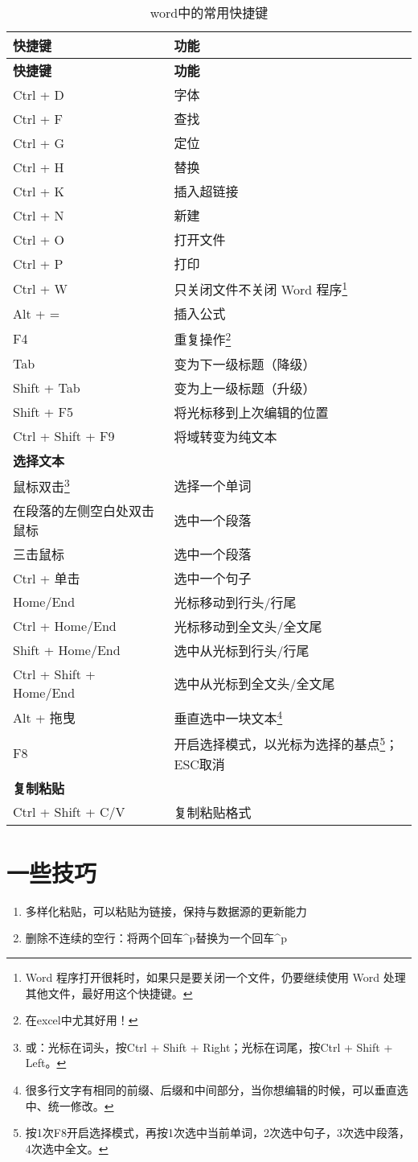 \documentclass[]{ctexbook}
\providecommand{\tightlist}{%
  \setlength{\itemsep}{0pt}\setlength{\parskip}{0pt}}
\begin{document}
\begin{longtable}[]{@{}ll@{}}
\caption{\label{tab:word-short} word中的常用快捷键}\tabularnewline
\toprule
\textbf{快捷键} & \textbf{功能}\tabularnewline
\midrule
\endfirsthead
\toprule
\textbf{快捷键} & \textbf{功能}\tabularnewline
\midrule
\endhead
Ctrl + D & 字体\tabularnewline
Ctrl + F & 查找\tabularnewline
Ctrl + G & 定位\tabularnewline
Ctrl + H & 替换\tabularnewline
Ctrl + K & 插入超链接\tabularnewline
Ctrl + N & 新建\tabularnewline
Ctrl + O & 打开文件\tabularnewline
Ctrl + P & 打印\tabularnewline
Ctrl + W & 只关闭文件不关闭 Word 程序\footnote{Word 程序打开很耗时，如果只是要关闭一个文件，仍要继续使用 Word 处理其他文件，最好用这个快捷键。}\tabularnewline
Alt + = & 插入公式\tabularnewline
F4 & 重复操作\footnote{在excel中尤其好用！}\tabularnewline
Tab & 变为下一级标题（降级）\tabularnewline
Shift + Tab & 变为上一级标题（升级）\tabularnewline
Shift + F5 & 将光标移到上次编辑的位置\tabularnewline
Ctrl + Shift + F9 & 将域转变为纯文本\tabularnewline
\textbf{选择文本} &\tabularnewline
鼠标双击\footnote{或：光标在词头，按Ctrl + Shift + Right；光标在词尾，按Ctrl + Shift + Left。} & 选择一个单词\tabularnewline
在段落的左侧空白处双击鼠标 & 选中一个段落\tabularnewline
三击鼠标 & 选中一个段落\tabularnewline
Ctrl + 单击 & 选中一个句子\tabularnewline
Home/End & 光标移动到行头/行尾\tabularnewline
Ctrl + Home/End & 光标移动到全文头/全文尾\tabularnewline
Shift + Home/End & 选中从光标到行头/行尾\tabularnewline
Ctrl + Shift + Home/End & 选中从光标到全文头/全文尾\tabularnewline
Alt + 拖曳 & 垂直选中一块文本\footnote{很多行文字有相同的前缀、后缀和中间部分，当你想编辑的时候，可以垂直选中、统一修改。}\tabularnewline
F8 & 开启选择模式，以光标为选择的基点\footnote{按1次F8开启选择模式，再按1次选中当前单词，2次选中句子，3次选中段落，4次选中全文。}；ESC取消\tabularnewline
\textbf{复制粘贴} &\tabularnewline
Ctrl + Shift + C/V & 复制粘贴格式\tabularnewline
\bottomrule
\end{longtable}

\hypertarget{word-skills}{%
\section{一些技巧}\label{word-skills}}

\begin{enumerate}
\def\labelenumi{\arabic{enumi}.}
\tightlist
\item
  多样化粘贴，可以粘贴为链接，保持与数据源的更新能力
\item
  删除不连续的空行：将两个回车\^{}p替换为一个回车\^{}p
\end{enumerate}
\end{document}
